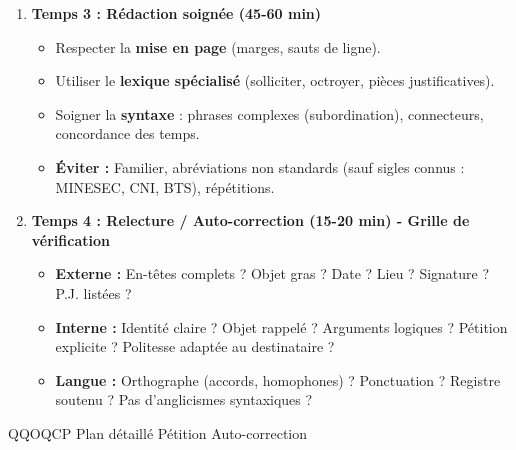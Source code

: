 \documentclass[11pt]{article}
\newcommand{\cle}[1]{{\popxbold\color{popdark}#1}}
\begin{document}
\begin{methode}
\begin{enumerate}
\begin{itemize}
        \item \textbf{Bas de page :} [Signature] + [Liste P.J. numérotée].
    \end{itemize}
    \item \textbf{Temps 3 : Rédaction soignée (45-60 min)}
    \begin{itemize}
        \item Respecter la \textbf{mise en page} (marges, sauts de ligne).
        \item Utiliser le \textbf{lexique spécialisé} (solliciter, octroyer, pièces justificatives).
        \item Soigner la \textbf{syntaxe} : phrases complexes (subordination), connecteurs, concordance des temps.
        \item \textbf{Éviter :} Familier, abréviations non standards (sauf sigles connus : MINESEC, CNI, BTS), répétitions.
    \end{itemize}
    \item \textbf{Temps 4 : Relecture / Auto-correction (15-20 min) - Grille de vérification}
    \begin{itemize}
        \item [ ] \textbf{Externe :} En-têtes complets ? Objet gras ? Date ? Lieu ? Signature ? P.J. listées ?
        \item [ ] \textbf{Interne :} Identité claire ? Objet rappelé ? Arguments logiques ? Pétition explicite ? Politesse adaptée au destinataire ?
        \item [ ] \textbf{Langue :} Orthographe (accords, homophones) ? Ponctuation ? Registre soutenu ? Pas d'anglicismes syntaxiques ?
    \end{itemize}
\end{enumerate}
\cle{QQOQCP} \cle{Plan détaillé} \cle{Pétition} \cle{Auto-correction}
\end{methode}
\end{document}

